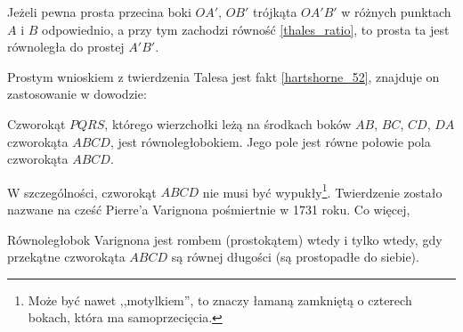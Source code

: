\begin{proposition}
    Jeżeli pewna prosta przecina boki $OA'$, $OB'$ trójkąta $OA'B'$ w różnych punktach $A$ i $B$ odpowiednio, a przy tym zachodzi równość \ref{thales_ratio}, to prosta ta jest równoległa do prostej $A'B'$.
\end{proposition}

Prostym wnioskiem z twierdzenia Talesa jest fakt \ref{hartshorne_52}, znajduje on zastosowanie w dowodzie:

\begin{theorem}[Varignona]
    Czworokąt $PQRS$, którego wierzchołki leżą na środkach boków $AB$, $BC$, $CD$, $DA$ czworokąta $ABCD$, jest równoległobokiem.
    Jego pole jest równe połowie pola czworokąta $ABCD$. %
\end{theorem}

W szczególności, czworokąt $ABCD$ nie musi być wypukły\footnote{Może być nawet ,,motylkiem'', to znaczy łamaną zamkniętą o czterech bokach, która ma samoprzecięcia.}.
Twierdzenie zostało nazwane na cześć Pierre'a Varignona pośmiertnie w 1731 roku.
%
Co więcej,

\begin{proposition}
    Równoległobok Varignona jest rombem (prostokątem) wtedy i tylko wtedy, gdy przekątne czworokąta $ABCD$ są równej długości (są prostopadłe do siebie).
%
%
%
\end{proposition}

%